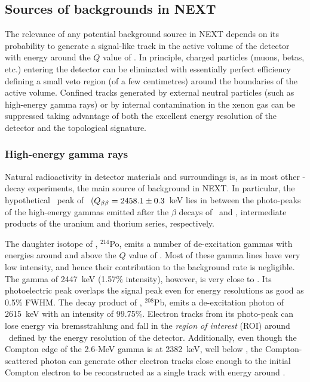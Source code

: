 

\subsection{Sources of backgrounds in NEXT} \label{sec:SignalAndBackground}


The relevance of any potential background source in NEXT depends on its probability to generate a signal-like track in the active volume of the detector with energy around the $Q$ value of \Xe. In principle, charged particles (muons, betas, etc.) entering the detector can be eliminated with essentially perfect efficiency defining a small veto region (of a few centimetres) around the boundaries of the active volume. Confined tracks generated by external neutral particles (such as high-energy gamma rays) or by internal contamination in the xenon gas can be suppressed taking advantage of both the excellent energy resolution of the detector and the topological signature.  


\subsubsection*{High-energy gamma rays}
Natural radioactivity in detector materials and surroundings is, as in most other \bbonu-decay experiments, the main source of background in NEXT. In particular, the hypothetical \bbonu\ peak of \Xe\ ($Q_{\beta\beta}=2458.1\pm0.3$~keV lies in between the photo-peaks of the high-energy gammas emitted after the $\beta$ decays of \Bi\ and \Tl, intermediate products of the uranium and thorium series, respectively. 

The daughter isotope of \Bi, $^{214}$Po, emits a number of de-excitation gammas with energies around and above the $Q$ value of \Xe. Most of these gamma lines have very low intensity, and hence their contribution to the background rate is negligible. The gamma of 2447~keV (1.57\% intensity), however, is very close to \Qbb. Its photoelectric peak overlaps the signal peak even for energy resolutions as good as 0.5\% FWHM. The decay product of \Tl, $^{208}$Pb, emits a de-excitation photon of 2615~keV with an intensity of 99.75\%. Electron tracks from its photo-peak can lose energy via bremsstrahlung and fall in the \emph{region of interest} (ROI) around \Qbb\ defined by the energy resolution of the detector. Additionally, even though the Compton edge of the 2.6-MeV gamma is at 2382~keV, well below \Qbb, the Compton-scattered photon can generate other electron tracks close enough to the initial Compton electron to be reconstructed as a single track with energy around \Qbb. 

